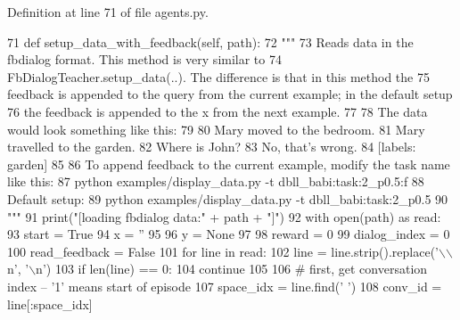Definition at line 71 of file agents.\+py.


\begin{DoxyCode}
71     \textcolor{keyword}{def }setup\_data\_with\_feedback(self, path):
72         \textcolor{stringliteral}{"""}
73 \textcolor{stringliteral}{        Reads data in the fbdialog format. This method is very similar to}
74 \textcolor{stringliteral}{        FbDialogTeacher.setup\_data(..). The difference is that in this method the}
75 \textcolor{stringliteral}{        feedback is appended to the query from the current example; in the default setup}
76 \textcolor{stringliteral}{        the feedback is appended to the x from the next example.}
77 \textcolor{stringliteral}{}
78 \textcolor{stringliteral}{        The data would look something like this:}
79 \textcolor{stringliteral}{}
80 \textcolor{stringliteral}{        Mary moved to the bedroom.}
81 \textcolor{stringliteral}{        Mary travelled to the garden.}
82 \textcolor{stringliteral}{        Where is John?}
83 \textcolor{stringliteral}{        No, that's wrong.}
84 \textcolor{stringliteral}{        [labels: garden]}
85 \textcolor{stringliteral}{}
86 \textcolor{stringliteral}{        To append feedback to the current example, modify the task name like this:}
87 \textcolor{stringliteral}{          python examples/display\_data.py -t dbll\_babi:task:2\_p0.5:f}
88 \textcolor{stringliteral}{        Default setup:}
89 \textcolor{stringliteral}{          python examples/display\_data.py -t dbll\_babi:task:2\_p0.5}
90 \textcolor{stringliteral}{        """}
91         print(\textcolor{stringliteral}{"[loading fbdialog data:"} + path + \textcolor{stringliteral}{"]"})
92         with open(path) \textcolor{keyword}{as} read:
93             start = \textcolor{keyword}{True}
94             x = \textcolor{stringliteral}{''}
95 
96             y = \textcolor{keywordtype}{None}
97 
98             reward = 0
99             dialog\_index = 0
100             read\_feedback = \textcolor{keyword}{False}
101             \textcolor{keywordflow}{for} line \textcolor{keywordflow}{in} read:
102                 line = line.strip().replace(\textcolor{stringliteral}{'\(\backslash\)\(\backslash\)n'}, \textcolor{stringliteral}{'\(\backslash\)n'})
103                 \textcolor{keywordflow}{if} len(line) == 0:
104                     \textcolor{keywordflow}{continue}
105 
106                 \textcolor{comment}{# first, get conversation index -- '1' means start of episode}
107                 space\_idx = line.find(\textcolor{stringliteral}{' '})
108                 conv\_id = line[:space\_idx]

\end{DoxyCode}
